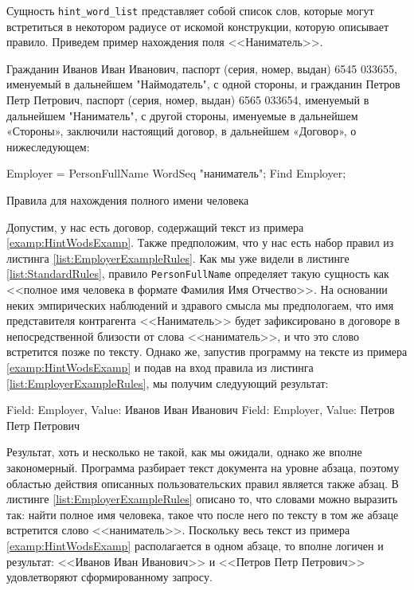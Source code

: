 Сущность \lstinline{hint_word_list} представляет собой список слов, которые могут встретиться в некотором радиусе от искомой конструкции, которую описывает правило. Приведем пример нахождения поля <<Наниматель>>.
\begin{myexample}
\label{examp:HintWodsExamp}
Гражданин Иванов Иван Иванович, паспорт (серия, номер, выдан) 6545 033655, именуемый в дальнейшем "Наймодатель", с одной стороны, и гражданин Петров Петр Петрович, паспорт (серия, номер, выдан) 6565 033654, именуемый в дальнейшем "Наниматель", с другой стороны, именуемые в дальнейшем «Стороны», заключили настоящий договор, в дальнейшем «Договор», о нижеследующем:
\end{myexample}
\begin{ListingEnv}
\begin{Verb}
Employer = PersonFullName WordSeq "наниматель";
Find Employer;
\end{Verb}
\label{list:EmployerExampleRules}
\caption{Правила для нахождения полного имени человека}
\end{ListingEnv}

Допустим, у нас есть договор, содержащий текст из примера \ref{examp:HintWodsExamp}. Также предположим, что у нас есть набор правил из листинга \ref{list:EmployerExampleRules}. Как мы уже видели в листинге \ref{list:StandardRules}, правило \lstinline{PersonFullName} определяет такую сущность как <<полное имя человека в формате Фамилия Имя Отчество>>. На основании неких эмпирических наблюдений и здравого смысла мы предпологаем, что имя представителя контрагента <<Наниматель>> будет зафиксировано в договоре в непосредственной близости от слова <<наниматель>>, и что это слово встретится позже по тексту. Однако же, запустив программу на тексте из примера \ref{examp:HintWodsExamp} и подав на вход правила из листинга \ref{list:EmployerExampleRules}, мы получим следуующий результат:
\begin{Verb}
Field: Employer, Value: Иванов Иван Иванович
Field: Employer, Value: Петров Петр Петрович
\end{Verb}
Результат, хоть и несколько не такой, как мы ожидали, однако же вполне закономерный. Программа разбирает текст документа на уровне абзаца, поэтому областью действия описанных пользовательских правил является также абзац. В листинге \ref{list:EmployerExampleRules} описано то, что словами можно выразить так: найти полное имя человека, такое что после него по тексту в том же абзаце встретится слово <<наниматель>>. Поскольку весь текст из примера \ref{examp:HintWodsExamp} располагается в одном абзаце, то вполне логичен и результат: <<Иванов Иван Иванович>> и <<Петров Петр Петрович>> удовлетворяют сформированному запросу.

